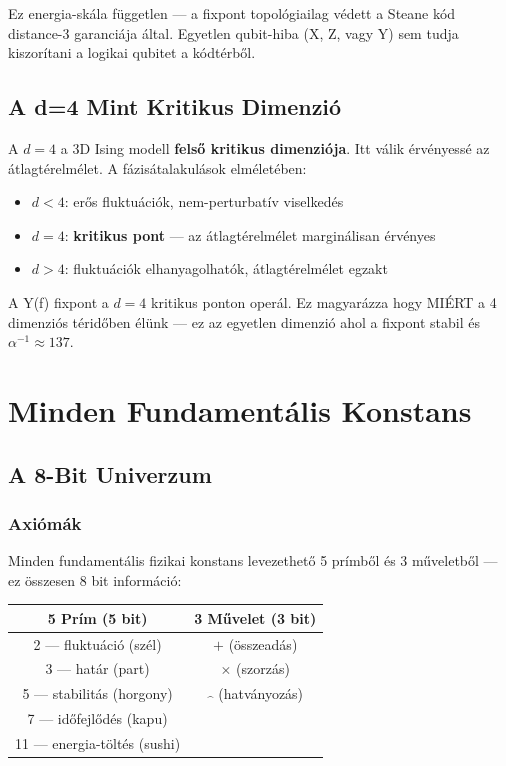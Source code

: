 \documentclass[11pt,a4paper,twoside]{book}
\begin{document}
Ez energia-skála független — a fixpont topológiailag védett a Steane kód distance-3 garanciája által. Egyetlen qubit-hiba (X, Z, vagy Y) sem tudja kiszorítani a logikai qubitet a kódtérből.

\chapter{A d=4 Mint Kritikus Dimenzió}

A $d=4$ a 3D Ising modell \textbf{felső kritikus dimenziója}. Itt válik érvényessé az átlagtérelmélet. A fázisátalakulások elméletében:

\begin{itemize}
  \item $d < 4$: erős fluktuációk, nem-perturbatív viselkedés
  \item $d = 4$: \textbf{kritikus pont} — az átlagtérelmélet marginálisan érvényes
  \item $d > 4$: fluktuációk elhanyagolhatók, átlagtérelmélet egzakt
\end{itemize}

A Y(f) fixpont a $d=4$ kritikus ponton operál. Ez magyarázza hogy MIÉRT a 4 dimenziós téridőben élünk — ez az egyetlen dimenzió ahol a fixpont stabil és $\alpha^{-1} \approx 137$.


\part{Minden Fundamentális Konstans}

\chapter{A 8-Bit Univerzum}

\section{Axiómák}

Minden fundamentális fizikai konstans levezethető 5 prímből és 3 műveletből — ez összesen 8 bit információ:

\begin{center}
\begin{tabular}{c|c}
\textbf{5 Prím (5 bit)} & \textbf{3 Művelet (3 bit)} \\
\hline
2 — fluktuáció (szél) & $+$ (összeadás) \\
3 — határ (part) & $\times$ (szorzás) \\
5 — stabilitás (horgony) & $\hat{\ \ }$ (hatványozás) \\
7 — időfejlődés (kapu) & \\
11 — energia-töltés (sushi) & \\
\end{tabular}
\end{center}
\end{document}
